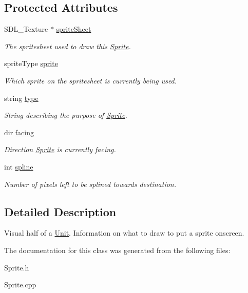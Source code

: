 \subsection*{Protected Attributes}
\begin{DoxyCompactItemize}
\item 
S\+D\+L\+\_\+\+Texture $\ast$ \hyperlink{class_sprite_aec7102885a3ca3fdd5124f8677135013}{sprite\+Sheet}\hypertarget{class_sprite_aec7102885a3ca3fdd5124f8677135013}{}\label{class_sprite_aec7102885a3ca3fdd5124f8677135013}

\begin{DoxyCompactList}\small\item\em The spritesheet used to draw this \hyperlink{class_sprite}{Sprite}. \end{DoxyCompactList}\item 
sprite\+Type \hyperlink{class_sprite_afbd06de3c7cace1c741bbb609abfa119}{sprite}\hypertarget{class_sprite_afbd06de3c7cace1c741bbb609abfa119}{}\label{class_sprite_afbd06de3c7cace1c741bbb609abfa119}

\begin{DoxyCompactList}\small\item\em Which sprite on the spritesheet is currently being used. \end{DoxyCompactList}\item 
string \hyperlink{class_sprite_af4ab6cfa8155326b6d8af31f943514f2}{type}\hypertarget{class_sprite_af4ab6cfa8155326b6d8af31f943514f2}{}\label{class_sprite_af4ab6cfa8155326b6d8af31f943514f2}

\begin{DoxyCompactList}\small\item\em String describing the purpose of \hyperlink{class_sprite}{Sprite}. \end{DoxyCompactList}\item 
dir \hyperlink{class_sprite_a40357a4e61f454decf1970929e9d2d0c}{facing}\hypertarget{class_sprite_a40357a4e61f454decf1970929e9d2d0c}{}\label{class_sprite_a40357a4e61f454decf1970929e9d2d0c}

\begin{DoxyCompactList}\small\item\em Direction \hyperlink{class_sprite}{Sprite} is currently facing. \end{DoxyCompactList}\item 
int \hyperlink{class_sprite_aa3a18aaf97a12edfced1b31f2323ae01}{spline}\hypertarget{class_sprite_aa3a18aaf97a12edfced1b31f2323ae01}{}\label{class_sprite_aa3a18aaf97a12edfced1b31f2323ae01}

\begin{DoxyCompactList}\small\item\em Number of pixels left to be splined towards destination. \end{DoxyCompactList}\end{DoxyCompactItemize}


\subsection{Detailed Description}
Visual half of a \hyperlink{class_unit}{Unit}. Information on what to draw to put a sprite onscreen. 

The documentation for this class was generated from the following files\+:\begin{DoxyCompactItemize}
\item 
Sprite.\+h\item 
Sprite.\+cpp\end{DoxyCompactItemize}

